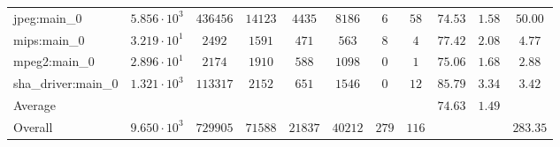 \begin{tabular}{|l|c|c|c|c|c|c|c|c|c|c|}
jpeg:main\_0            & $ 5.856 \cdot 10^{3} $ & $ 436456 $ & $ 14123 $ & $ 4435  $ & $ 8186  $ & $ 6   $ & $ 58  $ & $ 74.53       $ & $ 1.58    $ & $ 50.00   $ \\
mips:main\_0            & $ 3.219 \cdot 10^{1} $ & $ 2492   $ & $ 1591  $ & $ 471   $ & $ 563   $ & $ 8   $ & $ 4   $ & $ 77.42       $ & $ 2.08    $ & $ 4.77    $ \\
mpeg2:main\_0           & $ 2.896 \cdot 10^{1} $ & $ 2174   $ & $ 1910  $ & $ 588   $ & $ 1098  $ & $ 0   $ & $ 1   $ & $ 75.06       $ & $ 1.68    $ & $ 2.88    $ \\
sha\_driver:main\_0     & $ 1.321 \cdot 10^{3} $ & $ 113317 $ & $ 2152  $ & $ 651   $ & $ 1546  $ & $ 0   $ & $ 12  $ & $ 85.79       $ & $ 3.34    $ & $ 3.42    $ \\
\hline
Average                 & $                    $ & $        $ & $       $ & $       $ & $       $ & $     $ & $     $ & $ 74.63       $ & $ 1.49    $ & $         $ \\
\hline
Overall                 & $ 9.650 \cdot 10^{3} $ & $ 729905 $ & $ 71588 $ & $ 21837 $ & $ 40212 $ & $ 279 $ & $ 116 $ & $             $ & $         $ & $ 283.35  $ \\
\hline
\end{tabular}
